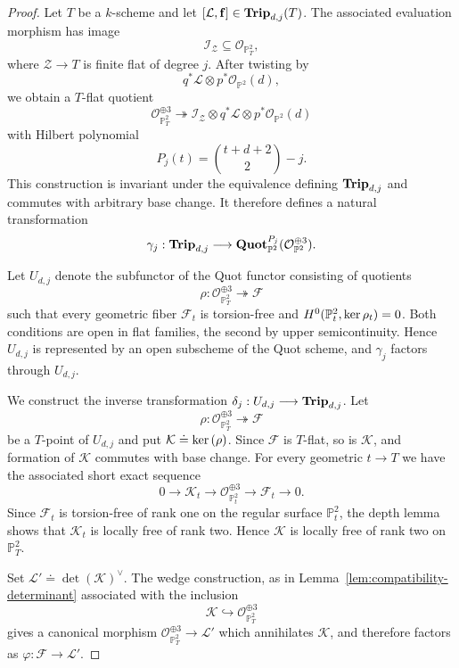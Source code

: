 \documentclass[11pt]{amsart} %
\newcommand{\lar}{\longrightarrow}
\theoremstyle{definition}
\def\ker{{\rm ker}\,}
\def\NZQ{\mathbb}               %
\def\PP{{\NZQ P}}
\def\Trip{{\bf Trip}}
\def\QuotF{{\bf Quot}}
\begin{document}
\begin{proof}
Let $T$ be a $k$-scheme and let \(
[\mathcal L,\mathbf f]\in\Trip_{d,j}(T)\). The associated evaluation morphism has image
\[
\mathcal I_{\mathcal Z}
\subseteq
\mathcal O_{\PP^2_T},
\]
where $\mathcal Z\lar T$ is finite flat of degree $j$. After twisting
by
\[
q^*\mathcal L\otimes p^*\mathcal O_{\PP^2}(d),
\]
we obtain a $T$-flat quotient
\[
\mathcal O_{\PP^2_T}^{\oplus3}
\twoheadrightarrow
\mathcal I_{\mathcal Z}
\otimes q^*\mathcal L
\otimes p^*\mathcal O_{\PP^2}(d)
\]
with Hilbert polynomial
\[
P_j(t)=\binom{t+d+2}{2}-j.
\]
This construction is invariant under the equivalence defining
$\Trip_{d,j}$ and commutes with arbitrary base change. It therefore
defines a natural transformation
\[
\gamma_j:
\Trip_{d,j}
\longrightarrow
\QuotF_{\PP^2}^{P_j}
(\mathcal O_{\PP^2}^{\oplus3}).
\]

Let $U_{d,j}$ denote the subfunctor of the Quot functor consisting of
quotients
\[
\rho:
\mathcal O_{\PP^2_T}^{\oplus3}
\twoheadrightarrow\mathcal F
\]
such that every geometric fiber $\mathcal F_t$ is torsion-free and \(H^0(\PP^2_t,\ker\rho_t)=0\). Both conditions are open in flat families, the second by upper
semicontinuity. Hence $U_{d,j}$ is represented by an open subscheme
of the Quot scheme, and $\gamma_j$ factors through $U_{d,j}$.

We construct the inverse transformation \(\delta_j:U_{d,j}\longrightarrow\Trip_{d,j}\). Let
\[
\rho:
\mathcal O_{\PP^2_T}^{\oplus3}
\twoheadrightarrow\mathcal F
\]
be a $T$-point of $U_{d,j}$ and put \(\mathcal K\doteq\ker(\rho)\). Since $\mathcal F$ is $T$-flat, so is $\mathcal K$, and formation
of $\mathcal K$ commutes with base change. For every geometric
$t\lar T$ we have the associated short exact sequence
\[
0\longrightarrow\mathcal K_t
\longrightarrow\mathcal O_{\PP^2_t}^{\oplus3}
\longrightarrow\mathcal F_t
\longrightarrow0.
\]
Since $\mathcal F_t$ is torsion-free of rank one on the regular
surface $\PP^2_t$, the depth lemma shows that $\mathcal K_t$ is
locally free of rank two. Hence $\mathcal K$ is locally free of rank
two on $\PP^2_T$.

Set \(
\mathcal L'\doteq\det(\mathcal K)^\vee\). The wedge construction, as in Lemma~\ref{lem:compatibility-determinant} associated with the inclusion
\[
\mathcal K\hookrightarrow\mathcal O_{\PP^2_T}^{\oplus3}
\]
gives a canonical morphism \(
\mathcal O_{\PP^2_T}^{\oplus3}
\longrightarrow\mathcal L' \) which annihilates $\mathcal K$, and therefore factors as
\( \varphi:
\mathcal F\longrightarrow\mathcal L'\).


\end{proof}
\end{document}
